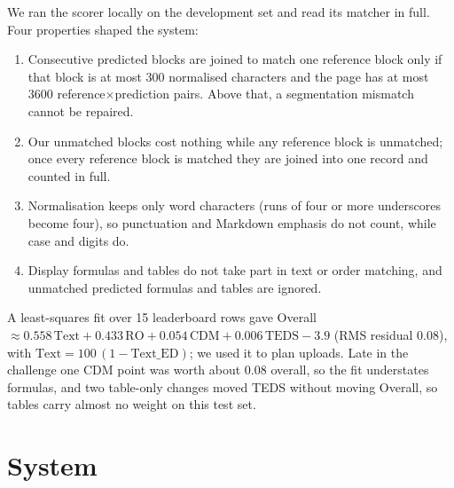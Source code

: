 \documentclass[11pt]{article}
\newcommand{\ted}{Text\_ED}
\begin{document}
We ran the scorer locally on the development set and read its matcher in full. Four properties shaped the system:
\begin{enumerate}
  \setlength\itemsep{0pt}
  \item Consecutive predicted blocks are joined to match one reference block only if that block is at most 300 normalised characters and the page has at most 3600 reference$\times$prediction pairs. Above that, a segmentation mismatch cannot be repaired.
  \item Our unmatched blocks cost nothing while any reference block is unmatched; once every reference block is matched they are joined into one record and counted in full.
  \item Normalisation keeps only word characters (runs of four or more underscores become four), so punctuation and Markdown emphasis do not count, while case and digits do.
  \item Display formulas and tables do not take part in text or order matching, and unmatched predicted formulas and tables are ignored.
\end{enumerate}
A least-squares fit over 15 leaderboard rows gave Overall $\approx 0.558\,\mathrm{Text} + 0.433\,\mathrm{RO} + 0.054\,\mathrm{CDM} + 0.006\,\mathrm{TEDS} - 3.9$ (RMS residual 0.08), with $\mathrm{Text}=100\,(1-\text{\ted})$; we used it to plan uploads. Late in the challenge one CDM point was worth about 0.08 overall, so the fit understates formulas, and two table-only changes moved TEDS without moving Overall, so tables carry almost no weight on this test set.

\section{System}
\label{sec:system}
\end{document}
